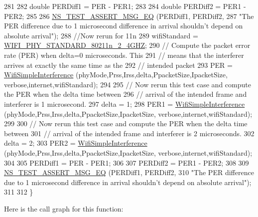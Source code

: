 \begin{DoxyCode}
281 
282   \textcolor{keywordtype}{double} PERDiff1 = PER - PER1;
283 
284   \textcolor{keywordtype}{double} PERDiff2 = PER1 - PER2;
285 
286   \hyperlink{group__testing_ga2a9d78cffb3db8e867c35fff0b698cf5}{NS\_TEST\_ASSERT\_MSG\_EQ} (PERDiff1, PERDiff2, 
287                          \textcolor{stringliteral}{"The PER difference due to 1 microsecond difference in arrival shouldn't depend on
       absolute arrival"});
288   \textcolor{comment}{//Now rerun for 11n}
289   wifiStandard = \hyperlink{group__wifi_gga1299834f4e1c615af3ca738033b76a49a6e449a5ca14fc7c0eb36064ce04a5192}{WIFI\_PHY\_STANDARD\_80211n\_2\_4GHZ};
290   \textcolor{comment}{// Compute the packet error rate (PER) when delta=0 microseconds.  This}
291   \textcolor{comment}{// means that the interferer arrives at exactly the same time as the}
292   \textcolor{comment}{// intended packet}
293   PER = \hyperlink{classWifiInterferenceTestCase_a360c9c443551246707b58ee879c37a5a}{WifiSimpleInterference} (phyMode,Prss,Irss,delta,PpacketSize,IpacketSize,
      verbose,internet,wifiStandard);
294 
295   \textcolor{comment}{// Now rerun this test case and compute the PER when the delta time between}
296   \textcolor{comment}{// arrival of the intended frame and interferer is 1 microsecond.}
297   delta = 1;
298   PER1 = \hyperlink{classWifiInterferenceTestCase_a360c9c443551246707b58ee879c37a5a}{WifiSimpleInterference} (phyMode,Prss,Irss,delta,PpacketSize,IpacketSize,
      verbose,internet,wifiStandard);
299 
300   \textcolor{comment}{// Now rerun this test case and compute the PER when the delta time between}
301   \textcolor{comment}{// arrival of the intended frame and interferer is 2 microseconds.}
302   delta = 2;
303   PER2 = \hyperlink{classWifiInterferenceTestCase_a360c9c443551246707b58ee879c37a5a}{WifiSimpleInterference} (phyMode,Prss,Irss,delta,PpacketSize,IpacketSize,
      verbose,internet,wifiStandard);
304 
305   PERDiff1 = PER - PER1;
306 
307   PERDiff2 = PER1 - PER2;
308 
309   \hyperlink{group__testing_ga2a9d78cffb3db8e867c35fff0b698cf5}{NS\_TEST\_ASSERT\_MSG\_EQ} (PERDiff1, PERDiff2, 
310                          \textcolor{stringliteral}{"The PER difference due to 1 microsecond difference in arrival shouldn't depend on
       absolute arrival"});
311 
312 \}
\end{DoxyCode}


Here is the call graph for this function\+:


